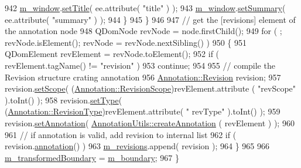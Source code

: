 \begin{DoxyCode}
942             \hyperlink{classOkular_1_1AnnotationPrivate_abcd3da119de1991beff85973cd951b64}{m\_window}.\hyperlink{classOkular_1_1Annotation_1_1Window_a9b44e65e008d12400c4cbcdd4d58e60e}{setTitle}( ee.attribute( \textcolor{stringliteral}{"title"} ) );
943             \hyperlink{classOkular_1_1AnnotationPrivate_abcd3da119de1991beff85973cd951b64}{m\_window}.\hyperlink{classOkular_1_1Annotation_1_1Window_a14857528578516a321a4901c49aaf60f}{setSummary}( ee.attribute( \textcolor{stringliteral}{"summary"} ) );
944         \}
945     \}
946 
947     \textcolor{comment}{// get the [revisions] element of the annotation node}
948     QDomNode revNode = node.firstChild();
949     \textcolor{keywordflow}{for} ( ; revNode.isElement(); revNode = revNode.nextSibling() )
950     \{
951         QDomElement revElement = revNode.toElement();
952         \textcolor{keywordflow}{if} ( revElement.tagName() != \textcolor{stringliteral}{"revision"} )
953             \textcolor{keywordflow}{continue};
954 
955         \textcolor{comment}{// compile the Revision structure crating annotation}
956         \hyperlink{classOkular_1_1Annotation_1_1Revision}{Annotation::Revision} revision;
957         revision.\hyperlink{classOkular_1_1Annotation_1_1Revision_a327f88072bfa9e168f7707d074a3fe21}{setScope}( (\hyperlink{classOkular_1_1Annotation_a9f71f811fcd4d3524e199e7eee4b6390}{Annotation::RevisionScope})revElement.attribute
      ( \textcolor{stringliteral}{"revScope"} ).toInt() );
958         revision.\hyperlink{classOkular_1_1Annotation_1_1Revision_a2ce88a1c549a6823c152e9784bc125b0}{setType}( (\hyperlink{classOkular_1_1Annotation_a76de7f3bda49c63bd319763c6ac46bd3}{Annotation::RevisionType})revElement.attribute( \textcolor{stringliteral}{"
      revType"} ).toInt() );
959         revision.\hyperlink{classOkular_1_1Annotation_1_1Revision_a603e0e104f21d2d9eaa63526c65e38ff}{setAnnotation}( \hyperlink{classOkular_1_1AnnotationUtils_a790854adbb753b2a448640021442bf73}{AnnotationUtils::createAnnotation}
      ( revElement ) );
960 
961         \textcolor{comment}{// if annotation is valid, add revision to internal list}
962         \textcolor{keywordflow}{if} ( revision.\hyperlink{classOkular_1_1Annotation_1_1Revision_ad6ba67028710fbe858e2deeb6b6b2aa4}{annotation}() )
963             \hyperlink{classOkular_1_1AnnotationPrivate_ab1c9337e62d1d85d6f3b9d0dc120fc8d}{m\_revisions}.append( revision );
964     \}
965 
966     \hyperlink{classOkular_1_1AnnotationPrivate_afb3198f13aa201601c71493bd2a32f63}{m\_transformedBoundary} = \hyperlink{classOkular_1_1AnnotationPrivate_a58948ebd679895ca16c5f9f917f23323}{m\_boundary};
967 \}
\end{DoxyCode}
